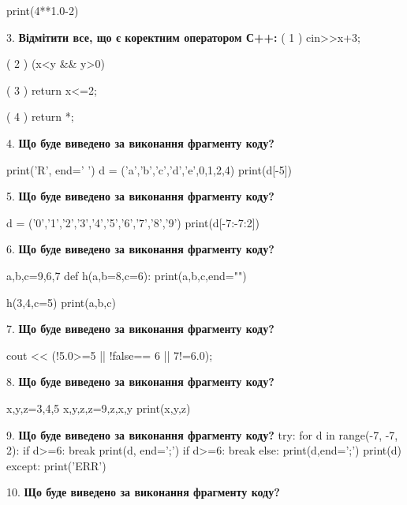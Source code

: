 \documentclass[11pt]{article}
\begin{document}
print(4**1.0-2)
\par\vspace{5mm}
3. %
\textbf{Відмітити все, що є коректним оператором С++:}
( 1 ) cin>>x+3;

( 2 ) (x<y && y>0)

( 3 ) return x<=2;

( 4 ) return *;
\par\vspace{5mm}
4. \textbf{Що буде виведено за виконання фрагменту коду?}

print('R', end=' ')
d = ('a','b','c','d','e',0,1,2,4)
print(d[-5])

\par\vspace{5mm}
5. \textbf{Що буде виведено за виконання фрагменту коду?}

d = ('0','1','2','3','4','5','6','7','8','9')
print(d[-7:-7:2])

\par\vspace{5mm}
6. \textbf{Що буде виведено за виконання фрагменту коду?}

a,b,c=9,6,7
def h(a,b=8,c=6):
    print(a,b,c,end="")

h(3,4,c=5)
print(a,b,c)

\par\vspace{5mm}
7. \textbf{Що буде виведено за виконання фрагменту коду?}

cout << (!5.0>=5 || !false== 6 || 7!=6.0);
\par\vspace{5mm}
8. \textbf{Що буде виведено за виконання фрагменту коду?}

x,y,z=3,4,5
x,y,z,z=9,z,x,y
print(x,y,z)
\par\vspace{5mm}
9. \textbf{Що буде виведено за виконання фрагменту коду?}
try:
    for d in range(-7, -7, 2):
        if d>=6:
            break
        print(d, end=';')
        if d>=6:
            break
    else:
        print(d,end=';')
    print(d)
except:
    print('ERR')
\par\vspace{5mm}
10. \textbf{Що буде виведено за виконання фрагменту коду?}
\end{document}

